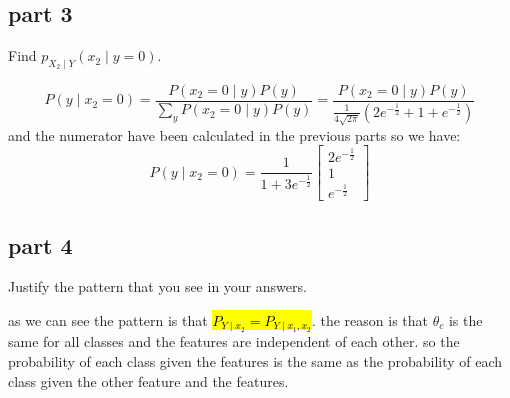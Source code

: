 \subsection{part 3}
Find $p_{X_2 \mid Y}(x_2 \mid y = 0)$.

\begin{qsolve}
	\begin{qsolve}[]
		$$P(y\mid x_2=0) = \frac{P(x_2 = 0 \mid y)P(y)}{\sum_{y}P(x_2 = 0 \mid y)P(y)} = \frac{P(x_2 = 0 \mid y)P(y)}{\frac{1}{4\sqrt{2\pi}}(2e^{-\frac{1}{2}} + 1+e^{-\frac{1}{2}})}$$
		and the numerator have been calculated in the previous parts so we have:
		$$P(y\mid x_2=0) = \frac{1}{1+3e^{-\frac{1}{2}}} \begin{bmatrix} 2e^{-\frac{1}{2}} \\ 1 \\ e^{-\frac{1}{2}} \end{bmatrix}$$
	\end{qsolve}
\end{qsolve}

\subsection{part 4}
Justify the pattern that you see in your answers.

\begin{qsolve}
	\begin{qsolve}[]
		as we can see the pattern is that \hl{$P_{Y\mid x_2} = P_{Y\mid x_1, x_2}$}.
		\splitqsolve[\splitqsolve]
		the reason is that $\theta_c$ is the same for all classes and the features are independent of each other. so the probability of each class given the features is the same as the probability of each class given the other feature and the features. 
	\end{qsolve}
\end{qsolve}
